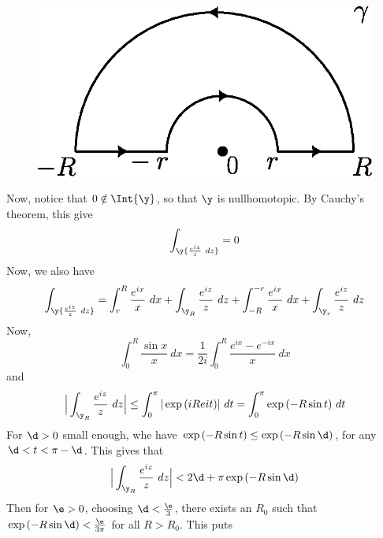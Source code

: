 \begin{example}
\begin{enumerate}
       \begin{figure}[h]
           \centering
           \includegraphics[scale=0.5]{Figures/Chapter5/contour_2.eps}
           \caption{}
           \label{figure_5.4}
       \end{figure}
       Now, notice that $0 \notin \Int{\y}$, so that $\y$ is nullhomotopic. By
       Cauchy's theorem, this give
       \begin{equation*}
           \int_\y{\frac{e^{iz}}{z} \ dz}=0
       \end{equation*}
       Now, we also have
       \begin{equation*}
           \int_\y{\frac{e^{iz}}{z} \ dz}=
           \int_r^R{\frac{e^{ix}}{x} \ dx}+
           \int_{\y_R}{\frac{e^{iz}}{z} \ dz}+
           \int_{-R}^{-r}{\frac{e^{ix}}{x} \ dx}+
           \int_{\y_r}{\frac{e^{iz}}{z} \ dz}
       \end{equation*}
       Now,
       \begin{equation*}
           \int_0^R{\frac{\sin{x}}{x} \
           dx}=\frac{1}{2i}\int_0^R{\frac{e^{ix}-e^{-ix}}{x} \ dx}
       \end{equation*}
       and
       \begin{equation*}
           \Big{|} \int_{\y_R}{\frac{e^{iz}}{z} \ dz} \Big{|} \leq
           \int_0^\pi{|\exp{(iRe{it})}| \ dt}=\int_0^\pi{\exp{(-R\sin{t})} \ dt}
       \end{equation*}
       For $\d>0$ small enough, whe have  $\exp{(-R\sin{t})} \leq
       \exp{(-R\sin{\d})}$, for any $\d<t<\pi-\d$. This gives that
       \begin{equation*}
           \Big{|} \int_{\y_R}{\frac{e^{iz}}{z} \ dz}
           \Big{|}<2\d+\pi\exp{(-R\sin{\d})}
       \end{equation*}
       Then for $\e>0$, choosing  $\d<\frac{\e}{3}$, there exists an $R_0$ such
       that $\exp{(-R\sin{\d})}<\frac{\e}{3\pi}$ for all $R>R_0$. This puts

\end{enumerate}
\end{example}
